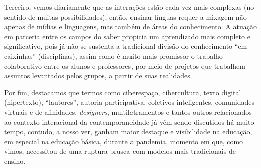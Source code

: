 	Terceiro, vemos diariamente que as interações estão cada vez mais complexas (no sentido de muitas possibilidades); então, ensinar línguas requer a mixagem não apenas de mídias e linguagens, mas também de áreas do conhecimento. A atuação em parceria entre os campos do saber propicia um aprendizado mais completo e significativo, pois já não se sustenta a tradicional divisão do conhecimento “em caixinhas” (disciplinas), assim como é muito mais promissor o trabalho colaborativo entre os alunos e professores, por meio de projetos que trabalhem assuntos levantados pelos grupos, a partir de suas realidades.
	
	Por fim, destacamos que termos como ciberespaço, cibercultura, texto digital (hipertexto), “lautores”, autoria participativa, coletivos inteligentes, comunidades virtuais e de afinidades, \textit{designers}, multiletramentos e tantos outros relacionados ao contexto interacional da contemporaneidade já vêm sendo discutidos há muito tempo, contudo, a nosso ver, ganham maior destaque e visibilidade na educação, em especial na educação básica, durante a pandemia, momento em que, como vimos, necessitou de uma ruptura brusca com modelos mais tradicionais de ensino.